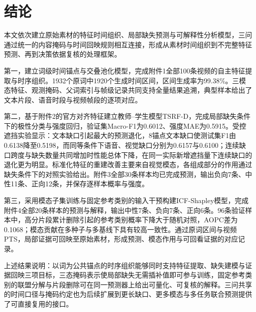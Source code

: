 \section{结论}
本文依次建立原始素材的特征时间组织、局部缺失预测与可解释性分析模型，三问通过统一的内容掩码与时间回映规则相互连接，形成从素材时间组织到不完整特征预测、再到决策依据复核的处理框架。

第一，建立词级时间锚点与交叠池化模型，完成附件1全部100条视频的自主特征提取与时序组织。1932个原词中1920个生成时间区间，区间生成率为99.38\%。三模态特征、观测掩码、父词索引与帧级记录共同支持全量结果追溯，典型样本给出了文本片段、语音时段与视频帧段的逐项对应。

第二，基于附件2的官方对齐特征建立教师--学生模型TSRF-D，完成局部缺失条件下的极性分类与强度回归，验证集Macro-F1为0.6012、强度MAE为0.5915。受控遮挡实验显示：文本缺口引起最大的预测退化，8锚点文本缺口使测试集F1由0.6138降至0.5198，而同等条件下语音、视觉缺口分别为0.6157与0.6100；连续缺口跨度与缺失数量共同增加时性能总体下降，在同一实际新增遮挡量下连续缺口的退化更为明显。标准化特征的重建改善主要来自视觉模态，各组成部分的作用通过缺失条件下的对照实验给出。附件3全部30条样本均已完成预测，输出负向7条、中性11条、正向12条，并保存逐样本概率与强度。

第三，采用模态子集训练与固定参考类别的输入干预构建ICF-Shapley模型，完成附件4全部20条样本的预测与解释，输出中性7条、负向7条、正向6条。96条验证样本中，高分片段累计删除引起的参考类别概率下降大于随机对照，AOPC差为0.1068；模态贡献在多种子与多基线下具有较高一致性。通过原词区间与视频PTS，局部证据可回映至原始素材，形成预测、模态作用与可回看证据的对应记录。

上述结果说明：以词为公共锚点的时序组织能够同时支持特征提取、缺失建模与证据回映三项目标，三态掩码表示使局部缺失无需插补值即可参与训练，固定参考类别的联盟分解与片段删除可在同一预测器上给出可量化、可复核的解释。三问共享的时间口径与掩码约定也为后续扩展到更长缺口、更多模态与多任务联合预测提供了可直接复用的接口。
